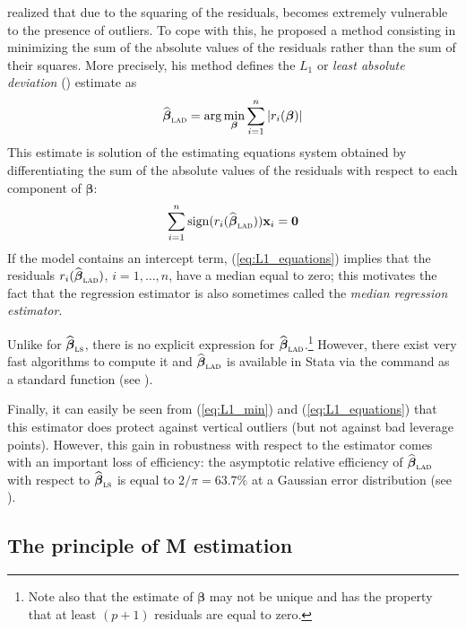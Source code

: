 \citet{edgeworth:1887} realized that due to the squaring of the residuals,
 becomes extremely vulnerable to the presence of outliers. To cope
with this, he proposed a method consisting in minimizing the sum of the
absolute values of the residuals rather than the sum of their squares. More
precisely, his method defines the $L_{1}$ or \emph{least absolute deviation}
() estimate as
%
\begin{equation}\label{eq:L1_min}
    \sthat{\boldsymbol\beta}_{\stsc{LAD}} 
        = \arg\min_{\boldsymbol\beta} \sum_{i=1}^{n} |r_{i}(\boldsymbol\beta)|
\end{equation}
%
This estimate is solution of the estimating equations system obtained by
differentiating the sum of the absolute values of the residuals with respect
to each component of $\boldsymbol\beta$:
%
\begin{equation}\label{eq:L1_equations}
    \sum_{i=1}^{n}\sign(r_{i}(\sthat{\boldsymbol\beta}_{\stsc{LAD}})) 
    \stvec{x}_{i} = \stvec{0}
\end{equation}
%
If the model contains an intercept term, (\ref{eq:L1_equations}) implies that
the residuals $r_{i}(\sthat{\boldsymbol\beta}_{\stsc{LAD}})$, $i = 1, \dots,
n$, have a median equal to zero; this motivates the fact that the 
regression estimator is also sometimes called the \emph{median regression
estimator}.

Unlike for $\sthat{\boldsymbol\beta}_{\stsc{LS}}$, there is no explicit
expression for $\sthat{\boldsymbol\beta}_{\stsc{LAD}}$.\footnote{Note also that
the  estimate of $\boldsymbol\beta$ may not be unique and has the
property that at least $(p+1)$ residuals are equal to zero.} However, there
exist very fast algorithms to compute it and
$\sthat{\boldsymbol{\beta}}_{\stsc{LAD}}$ is available in Stata via the
 command as a standard function (see ).

Finally, it can easily be seen from (\ref{eq:L1_min}) and
(\ref{eq:L1_equations}) that this estimator does protect against vertical
outliers (but not against bad leverage points). However, this gain in
robustness with respect to the  estimator comes with an important loss
of efficiency: the asymptotic relative efficiency of
$\sthat{\boldsymbol{\beta}}_{\stsc{LAD}}$ with respect to
$\sthat{\boldsymbol\beta}_{\stsc{LS}}$ is equal to $2/\pi = 63.7\%$ at a
Gaussian error distribution (see \citealp{huber:1981}).

\subsection{The principle of M estimation}

